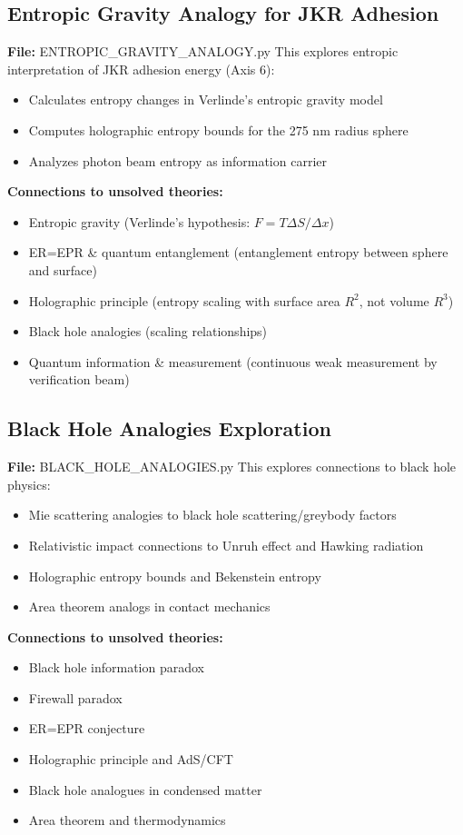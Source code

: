 \documentclass[11pt]{article}
\begin{document}
\subsection{Entropic Gravity Analogy for JKR Adhesion}
\textbf{File:} ENTROPIC\_GRAVITY\_ANALOGY.py
This explores entropic interpretation of JKR adhesion energy (Axis 6):
\begin{itemize}
\item Calculates entropy changes in Verlinde's entropic gravity model
\item Computes holographic entropy bounds for the 275 nm radius sphere
\item Analyzes photon beam entropy as information carrier
\end{itemize}
\textbf{Connections to unsolved theories:}
\begin{itemize}
\item Entropic gravity (Verlinde's hypothesis: $F = T \Delta S/\Delta x$)
\item ER=EPR \& quantum entanglement (entanglement entropy between sphere and surface)
\item Holographic principle (entropy scaling with surface area $R^2$, not volume $R^3$)
\item Black hole analogies (scaling relationships)
\item Quantum information \& measurement (continuous weak measurement by verification beam)
\end{itemize}

\subsection{Black Hole Analogies Exploration}
\textbf{File:} BLACK\_HOLE\_ANALOGIES.py
This explores connections to black hole physics:
\begin{itemize}
\item Mie scattering analogies to black hole scattering/greybody factors
\item Relativistic impact connections to Unruh effect and Hawking radiation
\item Holographic entropy bounds and Bekenstein entropy
\item Area theorem analogs in contact mechanics
\end{itemize}
\textbf{Connections to unsolved theories:}
\begin{itemize}
\item Black hole information paradox
\item Firewall paradox
\item ER=EPR conjecture
\item Holographic principle and AdS/CFT
\item Black hole analogues in condensed matter
\item Area theorem and thermodynamics
\end{itemize}
\end{document}
